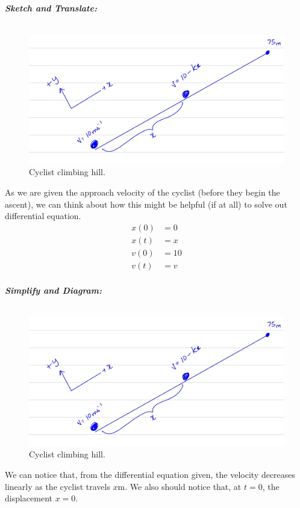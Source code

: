 \begin{subquestions}
\begin{subsubquestions}
\subsubquestion

\textbf{\textit{Sketch and Translate:}} \\ \\
\begin{figure}[H]
	\begin{center}
		\includegraphics[scale=0.25]{../2013/figures/2013q5-3}
		\caption{\label{2013:q5:Sketch3} Cyclist climbing hill.}
	\end{center}
\end{figure}
As we are given the approach velocity of the cyclist (before they begin the ascent), we can think about how this might be helpful (if at all) to solve out differential equation. \TODO{}
\begin{align}
	x(0) &= 0 \\
	x(t) &= x\\
	v(0) &= 10 \\
	v(t) &= v \\
\end{align}
	
	
	
	
\textbf{\textit{Simplify and Diagram:}} \\ \\
\begin{figure}[H]
	\begin{center}
		\includegraphics[scale=0.25]{../2013/figures/2013q5-3}
		\caption{\label{2013:q5:Diagram3} Cyclist climbing hill.}
	\end{center}
\end{figure}
We can notice that, from the differential equation given, the velocity decreases linearly as the cyclist travels $x$m. We also should notice that, at $t=0$, the displacement $x=0$.





\end{subsubquestions}
\end{subquestions}
